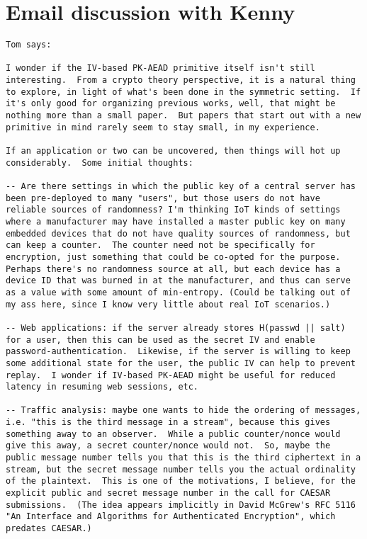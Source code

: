 \eject
\section*{Email discussion with Kenny}
\begin{lstlisting}
Tom says:

I wonder if the IV-based PK-AEAD primitive itself isn't still interesting.  From a crypto theory perspective, it is a natural thing to explore, in light of what's been done in the symmetric setting.  If it's only good for organizing previous works, well, that might be nothing more than a small paper.  But papers that start out with a new primitive in mind rarely seem to stay small, in my experience.

If an application or two can be uncovered, then things will hot up considerably.  Some initial thoughts:

-- Are there settings in which the public key of a central server has been pre-deployed to many "users", but those users do not have reliable sources of randomness? I'm thinking IoT kinds of settings where a manufacturer may have installed a master public key on many embedded devices that do not have quality sources of randomness, but can keep a counter.  The counter need not be specifically for encryption, just something that could be co-opted for the purpose.  Perhaps there's no randomness source at all, but each device has a device ID that was burned in at the manufacturer, and thus can serve as a value with some amount of min-entropy. (Could be talking out of my ass here, since I know very little about real IoT scenarios.)

-- Web applications: if the server already stores H(passwd || salt) for a user, then this can be used as the secret IV and enable password-authentication.  Likewise, if the server is willing to keep some additional state for the user, the public IV can help to prevent replay.  I wonder if IV-based PK-AEAD might be useful for reduced latency in resuming web sessions, etc.

-- Traffic analysis: maybe one wants to hide the ordering of messages, i.e. "this is the third message in a stream", because this gives something away to an observer.  While a public counter/nonce would give this away, a secret counter/nonce would not.  So, maybe the public message number tells you that this is the third ciphertext in a stream, but the secret message number tells you the actual ordinality of the plaintext.  This is one of the motivations, I believe, for the explicit public and secret message number in the call for CAESAR submissions.  (The idea appears implicitly in David McGrew's RFC 5116 "An Interface and Algorithms for Authenticated Encryption", which predates CAESAR.) 


\end{lstlisting}
